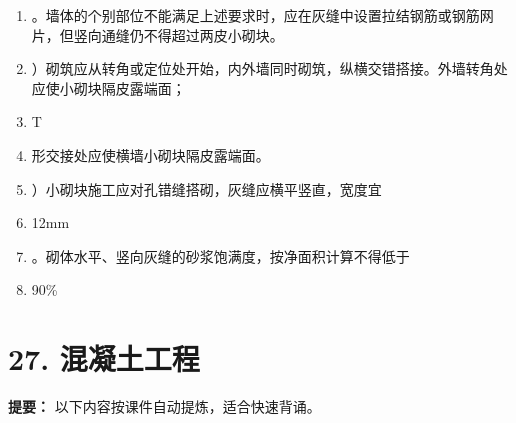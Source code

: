 \documentclass[UTF8,fontset=fandol,11pt]{ctexart}
\begin{document}
\begin{enumerate}[label=\arabic*.]
\item 。墙体的个别部位不能满足上述要求时，应在灰缝中设置拉结钢筋或钢筋网片，但竖向通缝仍不得超过两皮小砌块。

\item ）砌筑应从转角或定位处开始，内外墙同时砌筑，纵横交错搭接。外墙转角处应使小砌块隔皮露端面；

\item T

\item 形交接处应使横墙小砌块隔皮露端面。

\item ）小砌块施工应对孔错缝搭砌，灰缝应横平竖直，宽度宜

\item 12mm

\item 。砌体水平、竖向灰缝的砂浆饱满度，按净面积计算不得低于

\item 90\%

\end{enumerate}

\newpage

\section*{27. 混凝土工程}


\begin{mainbox}

\textbf{提要：} 以下内容按课件自动提炼，适合快速背诵。

\end{mainbox}
\end{document}
